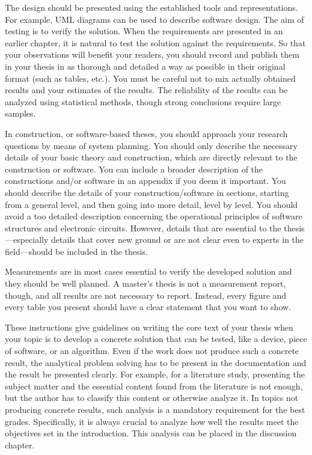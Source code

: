 The design should be presented using the established tools and representations. For example, UML diagrams can be used to describe software design. The aim of testing is to verify the solution. When the requirements are presented in an earlier chapter, it is natural to test the solution against the requirements. So that your observations will benefit your readers, you should record and publish them in your thesis in as thorough and detailed a way as possible in their original format (such as tables, etc.). You must be careful not to mix actually obtained results and your estimates of the results. The reliability of the results can be analyzed using statistical methods, though strong conclusions require large samples.

In construction, or software-based theses, you should approach your research questions by means of system planning. You should only describe the necessary details of your basic theory and construction, which are directly relevant to the construction or software. You can include a broader description of the constructions and/or software in an appendix if you deem it important. You should describe the details of your construction/software in sections, starting from a general level, and then going into more detail, level by level. You should avoid a too detailed description concerning the operational principles of software structures and electronic circuits. However, details that are essential to the thesis---especially details that cover new ground or are not clear even to experts in the field---should be included in the thesis.

Measurements are in most cases essential to verify the developed solution and they should be well planned. A master’s thesis is not a measurement report, though, and all results are not necessary to report. Instead, every figure and every table you present should have a clear statement that you want to show.

These instructions give guidelines on writing the core text of your thesis when your topic is to develop a concrete solution that can be tested, like a device, piece of software, or an algorithm. Even if the work does not produce such a concrete result, the analytical problem solving has to be present in the documentation and the result be presented clearly. For example, for a literature study, presenting the subject matter and the essential content found from the literature is not enough, but the author has to classify this content or otherwise analyze it. In topics not producing concrete results, such analysis is a mandatory requirement for the best grades. Specifically, it is always crucial to analyze how well the results meet the objectives set in the introduction. This analysis can be placed in the discussion chapter.


